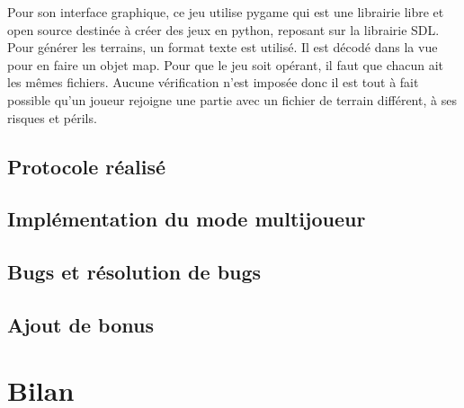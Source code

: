 \documentclass[12pt]{article}
\begin{document}
Pour son interface graphique, ce jeu utilise pygame qui est une librairie libre et open source destinée à créer des jeux en python, reposant sur la librairie SDL.
\\

Pour générer les terrains, un format texte est utilisé. Il est décodé dans la vue pour en faire un objet map. Pour que le jeu soit opérant, il faut que chacun ait les mêmes fichiers. Aucune vérification n'est imposée donc il est tout à fait possible qu'un joueur rejoigne une partie avec un fichier de terrain différent, à ses risques et périls.
\subsection{Protocole réalisé}

\subsection{Implémentation du mode multijoueur}

\subsection{Bugs et résolution de bugs}

\subsection{Ajout de bonus}
\newpage

\section{Bilan}
\end{document}
